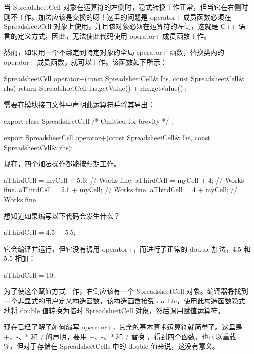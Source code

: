 当 SpreadsheetCell 对象在运算符的左侧时，隐式转换工作正常，但当它在右侧时则不工作。加法应该是交换的呀！这里的问题是 operator+ 成员函数必须在 SpreadsheetCell 对象上使用，并且该对象必须在运算符的左侧，这就是 C++ 语言的定义方式。因此，无法使此代码使用 operator+ 成员函数工作。

然而，如果用一个不绑定到特定对象的全局 operator+ 函数，替换类内的 operator+ 成员函数，就可以工作。该函数如下所示：

\begin{cpp}
SpreadsheetCell operator+(const SpreadsheetCell& lhs,
    const SpreadsheetCell& rhs)
{
    return SpreadsheetCell { lhs.getValue() + rhs.getValue() };
}
\end{cpp}

需要在模块接口文件中声明此运算符并将其导出：

\begin{cpp}
export class SpreadsheetCell { /* Omitted for brevity */ };

export SpreadsheetCell operator+(const SpreadsheetCell& lhs,
    const SpreadsheetCell& rhs);
\end{cpp}

现在，四个加法操作都能按预期工作。

\begin{cpp}
aThirdCell = myCell + 5.6; // Works fine.
aThirdCell = myCell + 4; // Works fine.
aThirdCell = 5.6 + myCell; // Works fine.
aThirdCell = 4 + myCell; // Works fine.
\end{cpp}

想知道如果编写以下代码会发生什么？

\begin{cpp}
aThirdCell = 4.5 + 5.5;
\end{cpp}

它会编译并运行，但它没有调用 operator+，而进行了正常的 double 加法，4.5 和 5.5 相加：

\begin{cpp}
aThirdCell = 10;
\end{cpp}

为了使这个赋值方式工作，右侧应该有一个 SpreadsheetCell 对象。编译器将找到一个非显式的用户定义构造函数，该构造函数接受 double，使用此构造函数隐式地将 double 值转换为临时 SpreadsheetCell 对象，然后调用赋值运算符。


现在已经了解了如何编写 operator+，其余的基本算术运算符就简单了。这里是 +、-、* 和 / 的声明，要用 +、-、* 和 / 替换 ，得到四个函数，也可以重载 \%，但对于存储在 SpreadsheetCells 中的 double 值来说，这没有意义。

